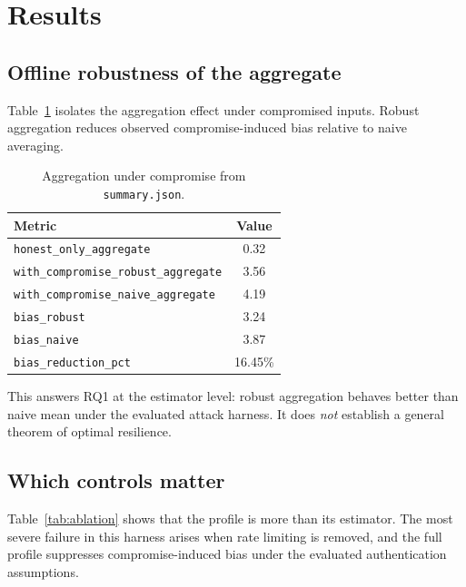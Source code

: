 \documentclass[11pt]{article}
\newcommand{\field}[1]{\texttt{#1}}
\begin{document}
\section{Results}

\subsection{Offline robustness of the aggregate}

Table~\ref{tab:agg} isolates the aggregation effect under compromised inputs. Robust aggregation reduces observed compromise-induced bias relative to naive averaging.

\begin{table}[H]
\centering
\caption{Aggregation under compromise from \field{summary.json}.}
\label{tab:agg}
\begin{tabular}{lc}
\toprule
Metric & Value \\
\midrule
\field{honest\_only\_aggregate} & 0.32 \\
\field{with\_compromise\_robust\_aggregate} & 3.56 \\
\field{with\_compromise\_naive\_aggregate} & 4.19 \\
\field{bias\_robust} & 3.24 \\
\field{bias\_naive} & 3.87 \\
\field{bias\_reduction\_pct} & 16.45\% \\
\bottomrule
\end{tabular}
\end{table}

This answers RQ1 at the estimator level: robust aggregation behaves better than naive mean under the evaluated attack harness. It does \emph{not} establish a general theorem of optimal resilience.

\subsection{Which controls matter}

Table~\ref{tab:ablation} shows that the profile is more than its estimator. The most severe failure in this harness arises when rate limiting is removed, and the full profile suppresses compromise-induced bias under the evaluated authentication assumptions.
\end{document}
